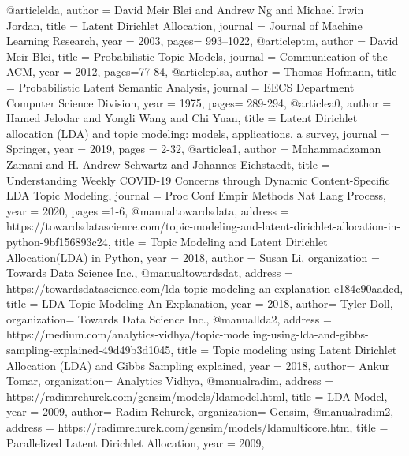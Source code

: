 \documentclass[german,version-2020-11]{uzl-thesis}
\begin{document}
\begin{bibtex-entries}


  @article{lda,
  author =       {David Meir Blei and Andrew Ng and Michael Irwin Jordan},
  title =        {Latent Dirichlet Allocation},
  journal =    {Journal of Machine Learning Research},
  year =         {2003},
  pages= {993--1022},
}
  @article{ptm,
  author =       {David Meir Blei},
  title =        {Probabilistic Topic Models},
  journal =    {Communication of the ACM},
  year =         {2012},
  pages={77-84},
}
  @article{plsa,
  author =       {Thomas Hofmann},
  title =        {Probabilistic Latent Semantic Analysis},
  journal =    {EECS Department Computer Science Division},
  year =         {1975},
  pages= {289-294},
}
  @article{a0,
  author =       {Hamed Jelodar and Yongli Wang and Chi Yuan},
  title =        {Latent Dirichlet allocation (LDA) and topic modeling: models, applications, a survey},
  journal =    {Springer},
  year =         {2019},
  pages = {2-32},
}
  @article{a1,
  author =       {Mohammadzaman Zamani and H. Andrew Schwartz and Johannes Eichstaedt},
  title =        {Understanding Weekly COVID-19 Concerns through Dynamic Content-Specific LDA Topic Modeling},
  journal =    {Proc Conf Empir Methods Nat Lang Process},
  year =         {2020},
  pages ={1-6},
}
  @manual{towardsdata,
  address =       {https://towardsdatascience.com/topic-modeling-and-latent-dirichlet-allocation-in-python-9bf156893c24},
  title =        {Topic Modeling and Latent Dirichlet Allocation(LDA) in Python},
  year =    {2018},
  author = {Susan Li},
  organization = {Towards Data Science Inc.},
}
  @manual{towardsdat,
  address =       {https://towardsdatascience.com/lda-topic-modeling-an-explanation-e184c90aadcd},
  title =        {LDA Topic Modeling An Explanation},
  year =    {2018},
  author= {Tyler Doll},
  organization= {Towards Data Science Inc.},
}
  @manual{lda2,
  address =       {https://medium.com/analytics-vidhya/topic-modeling-using-lda-and-gibbs-sampling-explained-49d49b3d1045},
  title =        {Topic modeling using Latent Dirichlet Allocation (LDA) and Gibbs Sampling explained},
  year =    {2018},
  author= {Ankur Tomar},
  organization= {Analytics Vidhya},
}
  @manual{radim,
  address =       {https://radimrehurek.com/gensim/models/ldamodel.html},
  title =        {LDA Model},
  year =    {2009},
  author= {Radim Rehurek},
  organization= {Gensim},
}
  @manual{radim2,
  address =       {https://radimrehurek.com/gensim/models/ldamulticore.htm},
  title =        {Parallelized Latent Dirichlet Allocation},
  year =    {2009},
}
\end{bibtex-entries}
\end{document}
